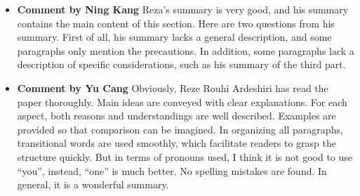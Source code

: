 \documentclass[paper=a4, fontsize=11pt]{scrartcl} %
\numberwithin{equation}{section} %
\numberwithin{figure}{section} %
\numberwithin{table}{section} %
\begin{document}
		\begin{itemize}
			\item \textbf{Comment by Ning Kang} \newline
				Reza's summary is very good, and his summary contains the main content of this section. Here are two questions from his summary. First of all, his summary lacks a general description, and some paragraphs only mention the precautions. In addition, some paragraphs lack a description of specific considerations, such as his summary of the third part.
			
			\item \textbf{Comment by Yu Cang} \newline
				Obviously, Reze Rouhi Ardeshiri has read the paper thoroughly. Main ideas are conveyed with clear explanations. For each aspect, both reasons and understandings are well described. Examples are provided so that comparison can be imagined. In organizing all paragraphs, transitional words are used smoothly, which facilitate readers to grasp the structure quickly. But in terms of pronouns used, I think it is not good to use “you”, instead, “one” is much better. No spelling mistakes are found. In general, it is a wonderful summary.
			
		\end{itemize}
	
\end{document}
